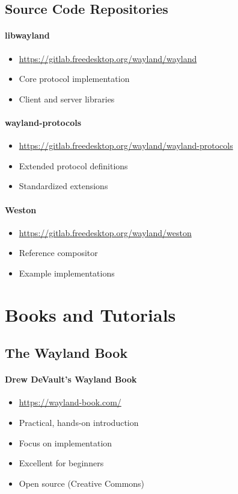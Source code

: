 \subsection{Source Code Repositories}

\paragraph{libwayland}
\begin{itemize}
    \item \url{https://gitlab.freedesktop.org/wayland/wayland}
    \item Core protocol implementation
    \item Client and server libraries
\end{itemize}

\paragraph{wayland-protocols}
\begin{itemize}
    \item \url{https://gitlab.freedesktop.org/wayland/wayland-protocols}
    \item Extended protocol definitions
    \item Standardized extensions
\end{itemize}

\paragraph{Weston}
\begin{itemize}
    \item \url{https://gitlab.freedesktop.org/wayland/weston}
    \item Reference compositor
    \item Example implementations
\end{itemize}

\section{Books and Tutorials}

\subsection{The Wayland Book}

\paragraph{Drew DeVault's Wayland Book}
\begin{itemize}
    \item \url{https://wayland-book.com/}
    \item Practical, hands-on introduction
    \item Focus on implementation
    \item Excellent for beginners
    \item Open source (Creative Commons)
\end{itemize}

